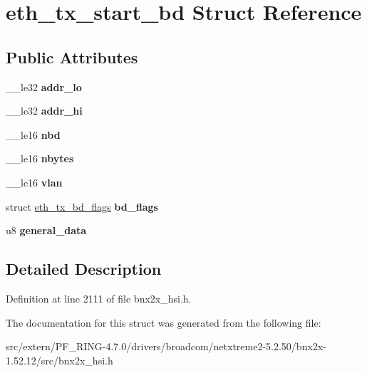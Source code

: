 \hypertarget{structeth__tx__start__bd}{
\section{eth\_\-tx\_\-start\_\-bd Struct Reference}
\label{structeth__tx__start__bd}
}
\subsection*{Public Attributes}
\begin{DoxyCompactItemize}
\item 
\hypertarget{structeth__tx__start__bd_a3d75d0d7c73e64b04a38984dc5dbac3d}{
\_\-\_\-le32 {\bfseries addr\_\-lo}}
\label{structeth__tx__start__bd_a3d75d0d7c73e64b04a38984dc5dbac3d}

\item 
\hypertarget{structeth__tx__start__bd_a7700b3f4b733d5fed8181507d57ed923}{
\_\-\_\-le32 {\bfseries addr\_\-hi}}
\label{structeth__tx__start__bd_a7700b3f4b733d5fed8181507d57ed923}

\item 
\hypertarget{structeth__tx__start__bd_afe955bda3483617f666c4358ec7b477f}{
\_\-\_\-le16 {\bfseries nbd}}
\label{structeth__tx__start__bd_afe955bda3483617f666c4358ec7b477f}

\item 
\hypertarget{structeth__tx__start__bd_af4f02383e2ef64a5553b1603555fd46b}{
\_\-\_\-le16 {\bfseries nbytes}}
\label{structeth__tx__start__bd_af4f02383e2ef64a5553b1603555fd46b}

\item 
\hypertarget{structeth__tx__start__bd_a83c6029da98328a3324184d0a2840a0f}{
\_\-\_\-le16 {\bfseries vlan}}
\label{structeth__tx__start__bd_a83c6029da98328a3324184d0a2840a0f}

\item 
\hypertarget{structeth__tx__start__bd_a63c8822df04b8ea678827f63bf7e85e2}{
struct \hyperlink{structeth__tx__bd__flags}{eth\_\-tx\_\-bd\_\-flags} {\bfseries bd\_\-flags}}
\label{structeth__tx__start__bd_a63c8822df04b8ea678827f63bf7e85e2}

\item 
\hypertarget{structeth__tx__start__bd_a398a6232df94ce1d3f33b33c5aca4699}{
u8 {\bfseries general\_\-data}}
\label{structeth__tx__start__bd_a398a6232df94ce1d3f33b33c5aca4699}

\end{DoxyCompactItemize}


\subsection{Detailed Description}


Definition at line 2111 of file bnx2x\_\-hsi.h.



The documentation for this struct was generated from the following file:\begin{DoxyCompactItemize}
\item 
src/extern/PF\_\-RING-\/4.7.0/drivers/broadcom/netxtreme2-\/5.2.50/bnx2x-\/1.52.12/src/bnx2x\_\-hsi.h\end{DoxyCompactItemize}

